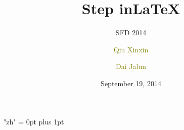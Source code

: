 \documentclass[notheorems,serif,table,compress]{beamer}  %
\begin{document}
\XeTeXlinebreaklocale "zh"         %
\XeTeXlinebreakskip = 0pt plus 1pt %
%

\title{Step in\;\LaTeX}
\subtitle{SFD 2014}
\author[Qiu]{\textcolor{olive}{Qiu Xinxin}\and \textcolor{olive}{Dai Jalun}}
\date[September 19, 2014]{September 19, 2014}
\frame{ \titlepage }
\def\hilite<#1>{\temporal<#1>{\color{blue!15}}{\color{black}}{\color{black}}}
\newcommand{\shadow}[2][purple]{\hskip5pt\shadowbox{\color{#1}\small \kai #2\vspace{3mm}}}
\newcommand{\colorrbox}[2][purple]{\doublebox{\color{#1}\small \kai#2}}
\end{document}
